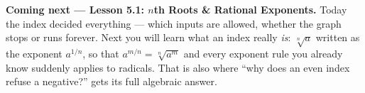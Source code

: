 \documentclass[10pt]{article}
\begin{document}
\begin{spiralbox}
\textbf{Coming next --- Lesson 5.1: $n$th Roots \& Rational Exponents.} Today the index decided
everything --- which inputs are allowed, whether the graph stops or runs forever. Next you will learn
what an index really \emph{is}: $\sqrt[n]{a}$ written as the exponent $a^{1/n}$, so that
$a^{m/n}=\sqrt[n]{a^m}$ and every exponent rule you already know suddenly applies to radicals. That
is also where ``why does an even index refuse a negative?'' gets its full algebraic answer.
\end{spiralbox}
\end{document}
